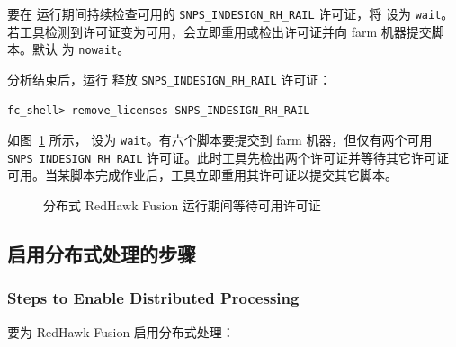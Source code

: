 要在  运行期间持续检查可用的 \texttt{SNPS\_INDESIGN\_RH\_RAIL} 许可证，将  设为 \texttt{wait}。若工具检测到许可证变为可用，会立即重用或检出许可证并向 farm 机器提交脚本。默认  为 \texttt{nowait}。

分析结束后，运行  释放 \texttt{SNPS\_INDESIGN\_RH\_RAIL} 许可证：
\begin{lstlisting}
fc_shell> remove_licenses SNPS_INDESIGN_RH_RAIL
\end{lstlisting}

如图~\ref{fig:lic-wait} 所示， 设为 \texttt{wait}。有六个脚本要提交到 farm 机器，但仅有两个可用 \texttt{SNPS\_INDESIGN\_RH\_RAIL} 许可证。此时工具先检出两个许可证并等待其它许可证可用。当某脚本完成作业后，工具立即重用其许可证以提交其它脚本。

\begin{figure}[htbp]
\centering
{}
\caption{分布式 RedHawk Fusion 运行期间等待可用许可证}
\label{fig:lic-wait}
\end{figure}

\subsection{启用分布式处理的步骤}
\subsubsection*{Steps to Enable Distributed Processing}

要为 RedHawk Fusion 启用分布式处理：

